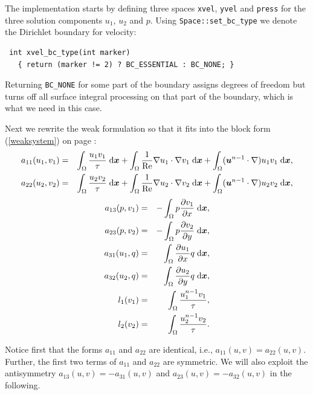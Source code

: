 \documentclass[11pt]{article}
\newcommand{\bfu}{\mbox{\boldmath $u$}}
\newcommand{\bfx}{\mbox{\boldmath $x$}}
\newcommand{\dd}[2]{\frac{\partial #1}{\partial #2}}
\newcommand{\dx}{\;\mbox{d}\bfx}
\begin{document}
The implementation starts by defining three spaces {\tt xvel}, {\tt yvel} and {\tt press}
for the three solution components $u_1$, $u_2$ and $p$. Using {\tt Space::set\_bc\_type}
we denote the Dirichlet boundary for velocity:
\begin{lstlisting}
 int xvel_bc_type(int marker)
   { return (marker != 2) ? BC_ESSENTIAL : BC_NONE; }
\end{lstlisting}
Returning {\tt BC\_NONE} for some part of the boundary assigns degrees of freedom but turns
off all surface integral processing on that part of the boundary, which is what we need
in this case.

Next we rewrite the weak formulation so that it fits into the block form (\ref{weaksystem})
on page \pageref{weaksystem}:
\begin{eqnarray*}
  a_{11}(u_1, v_1) &=& \int_\Omega \frac{u_1 v_1}{\tau} \dx +
                       \int_\Omega \frac{1}{\rm Re} \nabla u_1 \cdot \nabla v_1 \dx +
                       \int_\Omega (\bfu^{n-1} \cdot \nabla) u_1 v_1 \dx, \\
  a_{22}(u_2, v_2) &=& \int_\Omega \frac{u_2 v_2}{\tau} \dx +
                       \int_\Omega \frac{1}{\rm Re} \nabla u_2 \cdot \nabla v_2 \dx +
                       \int_\Omega (\bfu^{n-1} \cdot \nabla) u_2 v_2 \dx,
\end{eqnarray*}
\begin{eqnarray*}
  a_{13}(p, v_1) &=& -\int_\Omega p \dd{v_1}{x} \dx, \\
  a_{23}(p, v_2) &=& -\int_\Omega p \dd{v_2}{y} \dx, \\
  a_{31}(u_1, q) &=&  \int_\Omega \dd{u_1}{x} q \dx, \\
  a_{32}(u_2, q) &=&  \int_\Omega \dd{u_2}{y} q \dx, \\
  l_1(v_1) &=& \int_\Omega \frac{u^{n-1}_1 v_1}{\tau}, \\
  l_2(v_2) &=& \int_\Omega \frac{u^{n-1}_2 v_2}{\tau}.
\end{eqnarray*}

Notice first that the forms $a_{11}$ and $a_{22}$ are identical, i.e., $a_{11}(u,v) = a_{22}(u,v)$.
Further, the first two terms of $a_{11}$ and $a_{22}$ are symmetric. We will also exploit the
antisymmetry $a_{13}(u,v) = -a_{31}(u,v)$ and $a_{23}(u,v) = -a_{32}(u,v)$ in the following.
\end{document}
